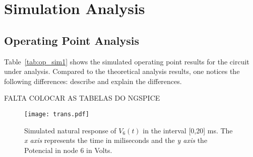\section{Simulation Analysis}
\label{sec:simulation}

\subsection{Operating Point Analysis}

Table~\ref{tab:op_sim1} shows the simulated operating point results for the circuit
under analysis. Compared to the theoretical analysis results, one notices the
following differences: describe and explain the differences.

FALTA COLOCAR AS TABELAS DO NGSPICE

\begin{figure}[h] \centering
\texttt{[image: trans.pdf]}
\caption{Simulated natural response of $V_6(t)$ in the interval [0,20] ms. The \textit{x axis} represents the time in miliseconds and the \textit{y axis} the Potencial in node 6  in Volts.  }
\label{fig:sim_natural}
\end{figure}









